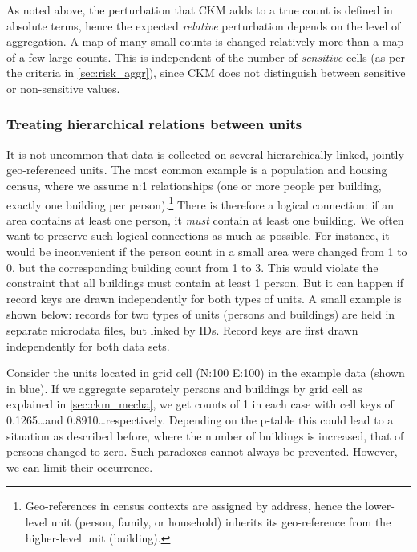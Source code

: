 As noted above, the perturbation that CKM adds to a true count is defined in absolute terms, hence the expected \emph{relative} perturbation depends on the level of aggregation. A map of many small counts is changed relatively more than a map of a few large counts. This is independent of the number of \emph{sensitive} cells (as per the criteria in \ref{sec:risk_aggr}), since CKM does not distinguish between sensitive or non-sensitive values.

\subsubsection{Treating hierarchical relations between units}

It is not uncommon that data is collected on several hierarchically linked, jointly geo-referenced units. The most common example is a population and housing census, where we assume n:1 relationships (one or more people per building, exactly one building per person).\footnote{
    Geo-references in census contexts are assigned by address, hence the lower-level unit (person, family, or household) inherits its geo-reference from the higher-level unit (building).} 
There is therefore a logical connection: if an area contains at least one person, it \emph{must} contain at least one building. We often want to preserve such logical connections as much as possible. For instance, it would be inconvenient if the person count in a small area were changed from 1 to 0, but the corresponding building count from 1 to 3. This would violate the constraint that all buildings must contain at least 1 person. But it can happen if record keys are drawn independently for both types of units.
A small example is shown below: records for two types of units (persons and buildings) are held in separate microdata files, but linked by IDs. Record keys are first drawn independently for both data sets.

Consider the units located in grid cell (N:100 E:100) in the example data (shown in blue). If we aggregate separately persons and buildings by grid cell as explained in \ref{sec:ckm_mecha}, we get counts of 1 in each case with cell keys of 0.1265\dots and 0.8910\dots respectively. Depending on the p-table this could lead to a situation as described before, where the number of buildings is increased, that of persons changed to zero.
Such paradoxes cannot always be prevented. However, we can limit their occurrence. 

